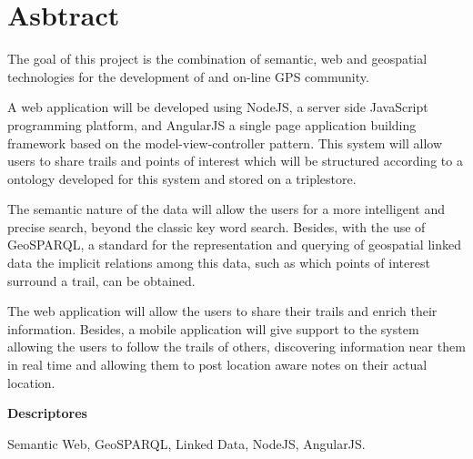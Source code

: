 \chapter*{Asbtract}

The goal of this project is the combination of semantic, web and geospatial technologies for the development of and on-line GPS community.
 
A web application will be developed using NodeJS, a server side JavaScript programming platform, and AngularJS a single page application building framework based on the model-view-controller pattern. This system will allow users to share trails and points of interest which will be structured according to a ontology developed for this system and stored on a triplestore.

The semantic nature of the data will allow the users for a more intelligent and precise search, beyond the classic key word search. Besides, with the use of GeoSPARQL, a standard for the representation and querying of geospatial linked data the implicit relations among this data, such as which points of interest surround a trail, can be obtained.

The web application will allow the users to share their trails and enrich their information. Besides, a mobile application will give support to the system allowing the users to follow the trails of others, discovering information near them in real time and allowing them to post location aware notes on their actual location.


\vspace{2em}

{\Large\bfseries\sectionfont Descriptores}
\vspace{3\medskipamount}

Semantic Web, GeoSPARQL, Linked Data, NodeJS, AngularJS.